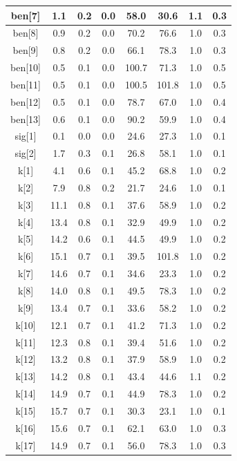\begin{longtable}{|c|c|c|c|c|c|c|c|}
\hline
ben[7] & 1.1 & 0.2 & 0.0 & 58.0 & 30.6 & 1.1 & 0.3 \\
\hline
ben[8] & 0.9 & 0.2 & 0.0 & 70.2 & 76.6 & 1.0 & 0.3 \\
\hline
ben[9] & 0.8 & 0.2 & 0.0 & 66.1 & 78.3 & 1.0 & 0.3 \\
\hline
ben[10] & 0.5 & 0.1 & 0.0 & 100.7 & 71.3 & 1.0 & 0.5 \\
\hline
ben[11] & 0.5 & 0.1 & 0.0 & 100.5 & 101.8 & 1.0 & 0.5 \\
\hline
ben[12] & 0.5 & 0.1 & 0.0 & 78.7 & 67.0 & 1.0 & 0.4 \\
\hline
ben[13] & 0.6 & 0.1 & 0.0 & 90.2 & 59.9 & 1.0 & 0.4 \\
\hline
sig[1] & 0.1 & 0.0 & 0.0 & 24.6 & 27.3 & 1.0 & 0.1 \\
\hline
sig[2] & 1.7 & 0.3 & 0.1 & 26.8 & 58.1 & 1.0 & 0.1 \\
\hline
k[1] & 4.1 & 0.6 & 0.1 & 45.2 & 68.8 & 1.0 & 0.2 \\
\hline
k[2] & 7.9 & 0.8 & 0.2 & 21.7 & 24.6 & 1.0 & 0.1 \\
\hline
k[3] & 11.1 & 0.8 & 0.1 & 37.6 & 58.9 & 1.0 & 0.2 \\
\hline
k[4] & 13.4 & 0.8 & 0.1 & 32.9 & 49.9 & 1.0 & 0.2 \\
\hline
k[5] & 14.2 & 0.6 & 0.1 & 44.5 & 49.9 & 1.0 & 0.2 \\
\hline
k[6] & 15.1 & 0.7 & 0.1 & 39.5 & 101.8 & 1.0 & 0.2 \\
\hline
k[7] & 14.6 & 0.7 & 0.1 & 34.6 & 23.3 & 1.0 & 0.2 \\
\hline
k[8] & 14.0 & 0.8 & 0.1 & 49.5 & 78.3 & 1.0 & 0.2 \\
\hline
k[9] & 13.4 & 0.7 & 0.1 & 33.6 & 58.2 & 1.0 & 0.2 \\
\hline
k[10] & 12.1 & 0.7 & 0.1 & 41.2 & 71.3 & 1.0 & 0.2 \\
\hline
k[11] & 12.3 & 0.8 & 0.1 & 39.4 & 51.6 & 1.0 & 0.2 \\
\hline
k[12] & 13.2 & 0.8 & 0.1 & 37.9 & 58.9 & 1.0 & 0.2 \\
\hline
k[13] & 14.2 & 0.8 & 0.1 & 43.4 & 44.6 & 1.1 & 0.2 \\
\hline
k[14] & 14.9 & 0.7 & 0.1 & 44.9 & 78.3 & 1.0 & 0.2 \\
\hline
k[15] & 15.7 & 0.7 & 0.1 & 30.3 & 23.1 & 1.0 & 0.1 \\
\hline
k[16] & 15.6 & 0.7 & 0.1 & 62.1 & 63.0 & 1.0 & 0.3 \\
\hline
k[17] & 14.9 & 0.7 & 0.1 & 56.0 & 78.3 & 1.0 & 0.3 \\

\end{longtable}
